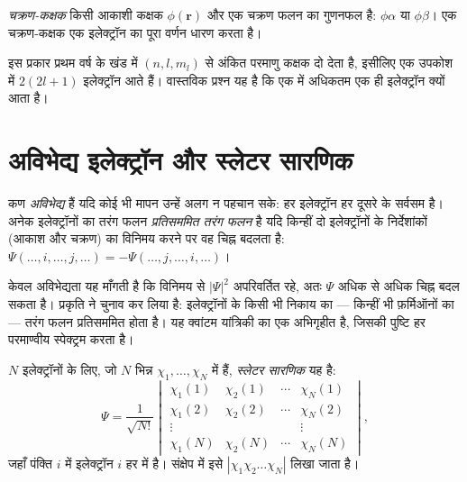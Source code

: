 \begin{definition}[चक्रण-कक्षक]\label{def:b3:many-electron-atoms:spin-orbital}
\emph{चक्रण-कक्षक} किसी आकाशी कक्षक
$\phi(\mathbf r)$ और एक चक्रण फलन का गुणनफल है: $\phi\alpha$ या $\phi\beta$। एक
चक्रण-कक्षक एक इलेक्ट्रॉन का पूरा वर्णन धारण करता है।
\end{definition}

इस प्रकार प्रथम वर्ष के खंड में $(n, l, m_l)$ से अंकित परमाणु कक्षक दो
 देता है, इसीलिए एक उपकोश में $2(2l+1)$ इलेक्ट्रॉन आते हैं। वास्तविक
प्रश्न यह है कि एक  में अधिकतम एक ही इलेक्ट्रॉन क्यों आता है।

\section{अविभेद्य इलेक्ट्रॉन और स्लेटर सारणिक}

\begin{definition}\label{def:b3:many-electron-atoms:indistinguishable}
कण \emph{अविभेद्य} हैं यदि
कोई भी मापन उन्हें अलग न पहचान सके: हर इलेक्ट्रॉन हर दूसरे के सर्वसम है।
अनेक इलेक्ट्रॉनों का तरंग फलन \emph{प्रतिसममित
तरंग फलन} है यदि किन्हीं दो इलेक्ट्रॉनों के
निर्देशांकों (आकाश और चक्रण) का विनिमय करने पर वह चिह्न बदलता है:
$\Psi(\dots,i,\dots,j,\dots) = -\Psi(\dots,j,\dots,i,\dots)$।
\end{definition}

केवल अविभेद्यता यह माँगती है कि विनिमय से $|\Psi|^2$ अपरिवर्तित रहे,
अतः $\Psi$ अधिक से अधिक चिह्न बदल सकता है। प्रकृति ने चुनाव कर लिया है:
इलेक्ट्रॉनों के किसी भी निकाय का --- किन्हीं भी फ़र्मिऑनों का --- तरंग फलन
प्रतिसममित होता है। यह क्वांटम यांत्रिकी का एक अभिगृहीत है, जिसकी पुष्टि हर
परमाण्वीय स्पेक्ट्रम करता है।

\begin{definition}[स्लेटर सारणिक]\label{def:b3:many-electron-atoms:slater}
$N$ इलेक्ट्रॉनों के लिए, जो $N$ भिन्न  $\chi_1, \dots, \chi_N$ में हैं,
\emph{स्लेटर सारणिक} यह है:
\[
\Psi = \frac{1}{\sqrt{N!}}\begin{vmatrix}
\chi_1(1) & \chi_2(1) & \cdots & \chi_N(1)\\
\chi_1(2) & \chi_2(2) & \cdots & \chi_N(2)\\
\vdots & & & \vdots\\
\chi_1(N) & \chi_2(N) & \cdots & \chi_N(N)
\end{vmatrix},
\]
जहाँ पंक्ति $i$ में इलेक्ट्रॉन $i$ हर  में है। संक्षेप में इसे
$|\chi_1\chi_2\dots\chi_N|$ लिखा जाता है।
\end{definition}

